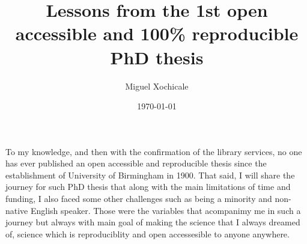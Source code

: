 \documentclass[11pt]{article}
\title{
Lessons from the 1st open accessible and 100\% reproducible 
PhD thesis}
\author{Miguel Xochicale}
\date{\today}
\begin{document}
\maketitle

To my knowledge, and then with the confirmation of the library services,
no one has ever published an open accessible and reproducible thesis 
since the establishment of University of Birmingham in 1900.  
That said, I will share the journey for such PhD thesis
that along with the main limitations of time and funding, 
I also faced some other challenges %
such as being a minority and non-native English speaker.  
Those were the variables that acompanimy me in such a journey 
but 
always with main goal of making the science that 
I always dreamed of, science which is 
reproduciblity and open accessesible to anyone anywhere.




\end{document}
